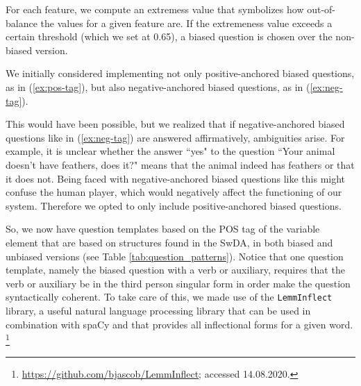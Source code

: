 \documentclass[11pt,a4paper]{article}
\begin{document}
For each feature, we compute an extremess value that symbolizes how out-of-balance the values for a given feature are.
If the extremeness value exceeds a certain threshold (which we set at 0.65), a biased question is chosen over the non-biased version.

We initially considered implementing not only positive-anchored biased questions, as in (\ref{ex:pos-tag}), but also negative-anchored biased questions, as in (\ref{ex:neg-tag}).

\label{ex:pos-tag} 
\vspace{-1.25\baselineskip}
\label{ex:neg-tag}

This would have been possible, but we realized that if negative-anchored biased questions like in (\ref{ex:neg-tag}) are answered affirmatively, ambiguities arise.
For example, it is unclear whether the answer ``yes" to the question ``Your animal doesn't have feathers, does it?" means that the animal indeed has feathers or that it does not.
Being faced with negative-anchored biased questions like this might confuse the human player, which would negatively affect the functioning of our system.
Therefore we opted to only include positive-anchored biased questions.

So, we now have question templates based on the POS tag of the variable element that are based on structures found in the SwDA, in both biased and unbiased versions (see Table \ref{tab:question_patterns}).
Notice that one question template, namely the biased question with a verb or auxiliary, requires that the verb or auxiliary be in the third person singular form in order make the question syntactically coherent. 
To take care of this, we made use of the \texttt{LemmInflect} library, a useful natural language processing library that can be used in combination with spaCy and that provides all inflectional forms for a given word.%
	\footnote{\url{https://github.com/bjascob/LemmInflect}; accessed 14.08.2020.}
\end{document}

